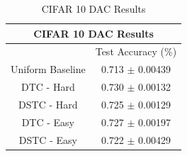\begin{table}[h!]
\caption{CIFAR 10 DAC Results} \label{tab:CIFAR DACResults}
\begin{tabular}{|c||c|}
\hline
\multicolumn{2}{|c|}{CIFAR 10 DAC Results} \\
\hline
 & Test Accuracy (\%) \\
\hline
Uniform Baseline&  0.713 $\pm$ 0.00439\\
\hline
DTC - Hard&  0.730 $\pm$ 0.00132 \\
\hline
DSTC - Hard & 0.725 $\pm$ 0.00129\\
\hline
DTC - Easy & 0.727 $\pm$ 0.00197 \\
\hline
DSTC - Easy & 0.722 $\pm$ 0.00429 \\
\hline
\end{tabular}
\end{table}



